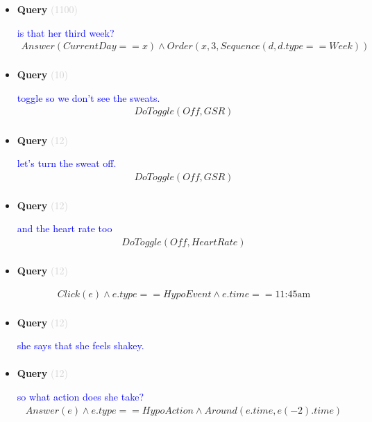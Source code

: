 \documentclass[11pt]{article}
\newcommand{\key}[1]{\textcolor{lightgray}{#1}}
\newcounter{CQuery}
\begin{document}
\begin{itemize}
\item
\textbf{Query\theCQuery} \key{(1100)} \addtocounter{CQuery}{1}
\textcolor{blue}{ is that her third week? }
\begin{multline*}
Answer(CurrentDay==x) \wedge Order(x, 3, Sequence(d, d.type==Week)) \\ 
\end{multline*}


\item
\textbf{Query\theCQuery} \key{(10)} \addtocounter{CQuery}{1}
\textcolor{blue}{ toggle so we don't see the sweats. }
\begin{multline*}
DoToggle(Off, GSR) \\ 
\end{multline*}


\item
\textbf{Query\theCQuery} \key{(12)} \addtocounter{CQuery}{1}
\textcolor{blue}{ let's turn the sweat off. }
\begin{multline*}
DoToggle(Off, GSR) \\ 
\end{multline*}


\item
\textbf{Query\theCQuery} \key{(12)} \addtocounter{CQuery}{1}
\textcolor{blue}{ and the heart rate too }
\begin{multline*}
DoToggle(Off, HeartRate) \\ 
\end{multline*}


\item
\textbf{Query\theCQuery} \key{(12)} \addtocounter{CQuery}{1}
\textcolor{blue}{  }
\begin{multline*}
Click(e) \wedge e.type == HypoEvent \wedge e.time == \mbox{11:45am} \\ 
\end{multline*}


\item
\textbf{Query\theCQuery} \key{(12)} \addtocounter{CQuery}{1}
\textcolor{blue}{ she says that she feels shakey. }
\begin{multline*}
\end{multline*}


\item
\textbf{Query\theCQuery} \key{(12)} \addtocounter{CQuery}{1}
\textcolor{blue}{ so what action does she take? }
\begin{multline*}
Answer(e) \wedge e.type == HypoAction \wedge Around(e.time, e(-2).time) \\ 
\end{multline*}



\end{itemize}
\end{document}
